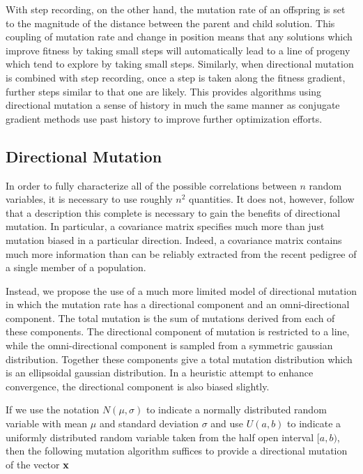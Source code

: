 \documentclass[12pt, titlepage]{article}
\begin{document}
With step recording, on the other hand, the mutation rate of an
offspring is set to the magnitude of the distance between the parent
and child solution.  This coupling of mutation rate and change in
position means that any solutions which improve fitness by taking
small steps will automatically lead to a line of progeny which tend to
explore by taking small steps.  Similarly, when directional mutation
is combined with step recording, once a step is taken along the
fitness gradient, further steps similar to that one are likely.  This
provides algorithms using directional mutation a sense of history in
much the same manner as conjugate gradient methods use past history to
improve further optimization efforts.

\subsection{Directional Mutation}

In order to fully characterize all of the possible correlations
between $n$ random variables, it is necessary to use roughly $n^2$
quantities.  It does not, however, follow that a description this
complete is necessary to gain the benefits of directional mutation.
In particular, a covariance matrix specifies much more than just
mutation biased in a particular direction.  Indeed, a covariance
matrix contains much more information than can be reliably extracted
from the recent pedigree of a single member of a population.

Instead, we propose the use of a much more limited model of
directional mutation in which the mutation rate has a directional
component and an omni-directional component.  The total mutation is
the sum of mutations derived from each of these components.  The
directional component of mutation is restricted to a line, while the
omni-directional component is sampled from a symmetric gaussian
distribution.  Together these components give a total mutation
distribution which is an ellipsoidal gaussian distribution.  In a
heuristic attempt to enhance convergence, the directional component is
also biased slightly.

If we use the notation $N(\mu, \sigma)$ to indicate a normally
distributed random variable with mean $\mu$ and standard deviation
$\sigma$ and use $U(a, b)$ to indicate a uniformly distributed random
variable taken from the half open interval $[a, b)$, then the
following mutation algorithm suffices to provide a directional
mutation of the vector $\bf x$
\end{document}
